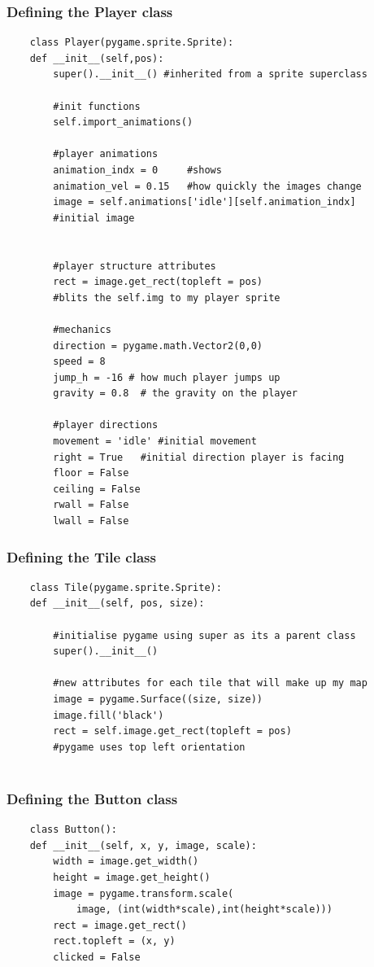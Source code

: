 \documentclass[12pt]{article}
\begin{document}
\subsubsection{Defining the Player class}
\begin{verbatim}
    class Player(pygame.sprite.Sprite):
    def __init__(self,pos):
        super().__init__() #inherited from a sprite superclass

        #init functions
        self.import_animations()

        #player animations
        animation_indx = 0     #shows
        animation_vel = 0.15   #how quickly the images change
        image = self.animations['idle'][self.animation_indx] 
        #initial image
        

        #player structure attributes
        rect = image.get_rect(topleft = pos)  
        #blits the self.img to my player sprite

        #mechanics
        direction = pygame.math.Vector2(0,0)
        speed = 8
        jump_h = -16 # how much player jumps up
        gravity = 0.8  # the gravity on the player 

        #player directions
        movement = 'idle' #initial movement
        right = True   #initial direction player is facing
        floor = False
        ceiling = False
        rwall = False
        lwall = False

\end{verbatim}

\subsubsection{Defining the Tile class}
\begin{verbatim}
    class Tile(pygame.sprite.Sprite):
    def __init__(self, pos, size):

        #initialise pygame using super as its a parent class
        super().__init__()
        
        #new attributes for each tile that will make up my map
        image = pygame.Surface((size, size))
        image.fill('black')
        rect = self.image.get_rect(topleft = pos) 
        #pygame uses top left orientation 
        
\end{verbatim}
\subsubsection{Defining the Button class}
\begin{verbatim}
    class Button():
    def __init__(self, x, y, image, scale):
	    width = image.get_width()
		height = image.get_height()
		image = pygame.transform.scale(
            image, (int(width*scale),int(height*scale)))
		rect = image.get_rect()
		rect.topleft = (x, y)
		clicked = False
\end{verbatim}
\end{document}
